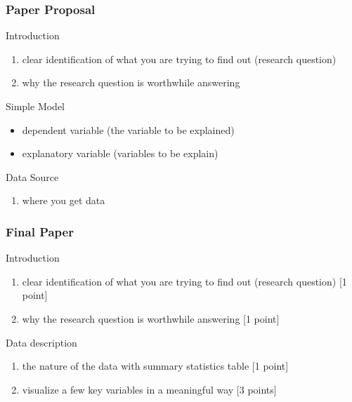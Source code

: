 \documentclass[fleqn]{beamer}\usepackage[]{graphicx}\usepackage[]{color}
\begin{document}
\begin{frame}[t]
  \frametitle{Paper Proposal} 
  \begin{block}{Introduction}
    \begin{enumerate}
      \item clear identification of what you are trying to find out (research question) 
      \item why the research question is worthwhile answering 
    \end{enumerate}
  \end{block}
  \begin{block}{Simple Model}  
    \begin{itemize}
      \item dependent variable (the variable to be explained)
      \item explanatory variable (variables to be explain)
    \end{itemize}
  \end{block}
  \begin{block}{Data Source}
     \begin{enumerate}
      \item where you get data
    \end{enumerate}
  \end{block}
\end{frame}

\begin{frame}[t]
  \frametitle{Final Paper}
  \begin{block}{Introduction}
    \begin{enumerate}
      \item clear identification of what you are trying to find out (research question) [1 point]
      \item why the research question is worthwhile answering [1 point]
    \end{enumerate}
  \end{block}
  \begin{block}{Data description}
     \begin{enumerate}
      \item the nature of the data with summary statistics table [1 point]
      \item visualize a few key variables in a meaningful way [3 points]
    \end{enumerate}
  \end{block}
\end{frame}
\end{document}
